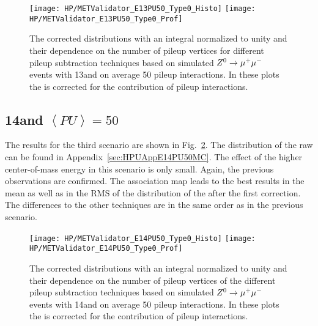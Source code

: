 \begin{figure}[Ht]
  \centering
  \texttt{[image: HP/METValidator\_E13PU50\_Type0\_Histo]}
  \texttt{[image: HP/METValidator\_E13PU50\_Type0\_Prof]}
  \caption[The corrected \MET{} distributions and their dependence on the number of pileup vertices for different pileup subtraction techniques based on simulated  $\Zz\rightarrow\MM$ events with 13\TeV and $\left<PU\right>=50$]{The corrected \MET{} distributions with an integral normalized to unity and their dependence on the number of pileup vertices for different pileup subtraction techniques based on simulated  $\Zz\rightarrow\MM$ events with 13\TeV and on average 50 pileup interactions. In these plots the \MET{} is corrected for the contribution of pileup interactions. \label{plot:HPUMETE13PU50T0}}
\end{figure}

\subsection{14\TeV and $\left<PU\right> =50$ \label{sec:HPUMETE14PU50}}

The results for the third scenario are shown in Fig.~\ref{plot:HPUMETE14PU50T0}. The distribution of the raw \MET{} can be found in Appendix~\ref{sec:HPUAppE14PU50MC}. The effect of the higher center-of-mass energy in this scenario is only small. Again, the previous observations are confirmed. The association map leads to the best results in the mean as well as in the RMS of the distribution of the \MET{} after the first correction. The differences to the other techniques are in the same order as in the previous scenario. 

\begin{figure}[Ht]
  \centering
  \texttt{[image: HP/METValidator\_E14PU50\_Type0\_Histo]}
  \texttt{[image: HP/METValidator\_E14PU50\_Type0\_Prof]}
  \caption[The corrected \MET{} distribution and their dependence on the number of pileup vertices for different pileup subtraction techniques based on simulated  $\Zz\rightarrow\MM$ events with 14\TeV and $\left<PU\right>=50$]{The corrected \MET{} distributions with an integral normalized to unity and their dependence on the number of pileup vertices of the different pileup subtraction techniques based on simulated  $\Zz\rightarrow\MM$ events with 14\TeV and on average 50 pileup interactions. In these plots the \MET{} is corrected for the contribution of pileup interactions. \label{plot:HPUMETE14PU50T0}}
\end{figure}


